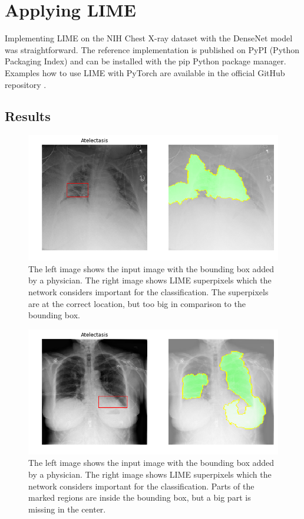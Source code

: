 \section{Applying LIME}
Implementing LIME on the NIH Chest X-ray dataset with the DenseNet model was straightforward. The reference implementation is published on PyPI (Python Packaging Index) and can be installed with the pip Python package manager. Examples how to use LIME with PyTorch are available in the official GitHub repository \cite{limegithub}.


\subsection{Results}
\begin{figure}[H]
\centering
\includegraphics[width=12cm]{chapters/03_classification/images/lime_0.png}
\caption{The left image shows the input image with the bounding box added by a physician. The right image shows LIME superpixels which the network considers important for the classification. The superpixels are at the correct location, but too big in comparison to the bounding box.}
\label{lime_example_1}
\end{figure}

\begin{figure}[H]
\centering
\includegraphics[width=12cm]{chapters/03_classification/images/lime_2.png}
\caption{The left image shows the input image with the bounding box added by a physician. The right image shows LIME superpixels which the network considers important for the classification. Parts of the marked regions are inside the bounding box, but a big part is missing in the center.}
\label{lime_example_2}
\end{figure}

